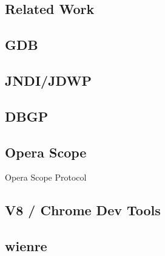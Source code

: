 \begin{relatedwork}
\section{Related Work}
\subsection{GDB}

\subsection{JNDI/JDWP}

\subsection{DBGP}

\subsection{Opera Scope}
Opera Scope Protocol \cite{opera-scope}

\subsection{V8 / Chrome Dev Tools}

\subsection{wienre}

\end{relatedwork}